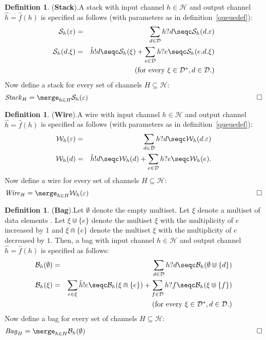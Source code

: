 \documentclass[a4paper,english,final]{article}
\theoremstyle{plain}
\theoremstyle{definition}
\newtheorem{definition}[theorem]{Definition}
\newcommand{\chan}{\ensuremath{\mathcal{H}}}
\newcommand{\data}{\ensuremath{\mathcal{D}}}
\begin{document}
\begin{definition}{(\textbf{Stack}).}\label{buffdef}
A stack with input channel $h\in \chan$ and output channel $\hat{h}=\hat{f}(h)$ is specified as follows (with parameters as in definition~\ref{queuedef}):
\begin{eqnarray*}
\mathcal{S}_{h}(\varepsilon)&=&\sum_{d\in \data}h?d\seqc \mathcal{S}_{h}(d.\varepsilon)\\
\mathcal{S}_{h}(d.\xi) &=& \hat{h}!d\seqc \mathcal{S}_{h}(\xi)+\sum_{e\in \data}h?e\seqc \mathcal{S}_{h}(e.d.\xi)\\
&&\mbox{ (for every $\xi\in\data^{*},d\in\data$.)}
\end{eqnarray*}
Now define a stack for every set of channels $H \subseteq \chan$:\newline
\[\mathit{Stack}_{H}= \merge_{h \in H}\mathcal{S}_{h}(\varepsilon) \hspace{7.7cm}\qed \]
\end{definition}
\begin{definition}{(\textbf{Wire}).}\label{buffdef}
A wire with input channel $h\in \chan$ and output channel $\hat{h}=\hat{f}(h)$ is specified as follows (with parameters as in definition~\ref{queuedef}):
\begin{eqnarray*}
\mathcal{W}_{h}(\varepsilon)&=&\sum_{d\in \data}h?d\seqc \mathcal{W}_{h}(d.\varepsilon)\\
\mathcal{W}_{h}(d)&=&\hat{h}!d\seqc\mathcal{W}_{h}(d)+\sum_{e\in\data}h?e\seqc\mathcal{W}_{h}(e).
\end{eqnarray*}
Now define a wire for every set of channels $H \subseteq \chan$:\newline
\[\mathit{Wire}_{H}= \merge_{h \in H}\mathcal{W}_{h}(\varepsilon) \hspace{7.7cm}\qed \]
\end{definition}
\begin{definition}{(\textbf{Bag}).}\label{buffdef}
Let $\emptyset$ denote the empty multiset. Let $\xi$ denote a multiset of data elements . Let $\xi\Cup\{e\}$ denote the multiset $\xi$ with the multiplicity of $e$ increased by $1$ and $\xi\Cap\{e\}$ denote the multiset $\xi$ with the multiplicity of $e$ decreased by $1$. Then, a bag with input channel $h\in \chan$ and output channel $\hat{h}=\hat{f}(h)$ is specified as follows:
\begin{eqnarray*}
\mathcal{B}_{h}(\emptyset)&=&\sum_{d\in \data}h?d\seqc \mathcal{B}_{h}(\emptyset\Cup\{d\})\\
\mathcal{B}_{h}(\xi) &=& \sum_{e\in \xi}\hat{h}!e\seqc \mathcal{B}_{h}(\xi\Cap \{e\})+\sum_{f\in \data}h?f\seqc \mathcal{B}_{h}(\xi\Cup\{f\})\\
&&\mbox{ (for every $\xi\in\data^{*},d\in\data$.)}
\end{eqnarray*}
Now define a bag for every set of channels $H\subseteq \chan$:\newline
\[\mathit{Bag}_{H}= \merge_{h \in H}\mathcal{B}_{h}(\emptyset) \hspace{7.7cm}\qed \]
\end{definition}
\end{document}
